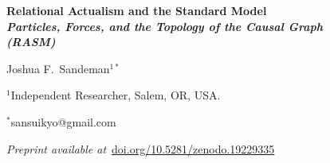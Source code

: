 \documentclass[11pt,a4paper]{article}
\begin{document}
\begin{center}
  {\LARGE\bfseries Relational Actualism and the Standard Model\\[4pt]
  \large\itshape Particles, Forces, and the Topology of the Causal Graph\\[2pt]
  \normalsize\upshape (RASM)\par}
  \vspace{14pt}
  {\large Joshua F.\ Sandeman$^{1*}$\par}
  \vspace{4pt}
  {\normalsize $^{1}$Independent Researcher, Salem, OR, USA.\par}
  {\normalsize $^{*}$sansuikyo@gmail.com\par}
  \vspace{8pt}
  {\small\textit{Preprint available at}~\href{https://doi.org/10.5281/zenodo.19229335}{doi.org/10.5281/zenodo.19229335}\par}
  \vspace{14pt}
\end{center}
\end{document}
